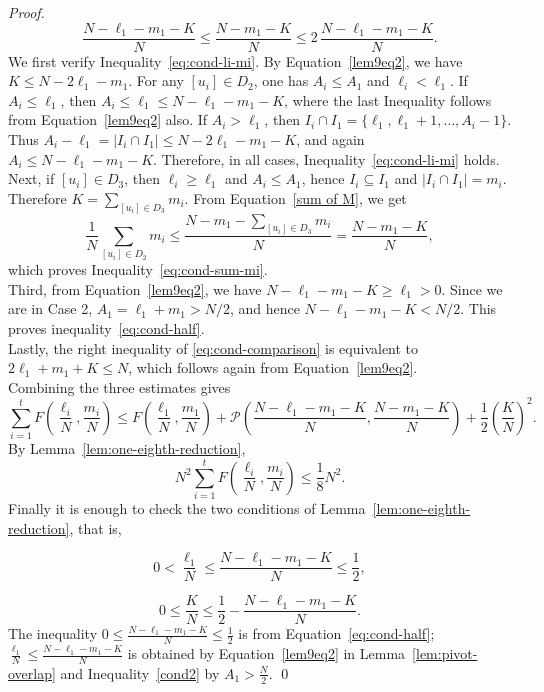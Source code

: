 \documentclass[runningheads,envcountsame,a4paper]{llncs}
\begin{document}
\begin{proof}
\begin{equation}\label{eq:cond-comparison}
    \frac{N-\ell_1-m_1-K}{N}
    \le
    \frac{N-m_1-K}{N}
    \le
    2\,\frac{N-\ell_1-m_1-K}{N}.
\end{equation}
We first verify Inequality~\ref{eq:cond-li-mi}. By Equation~\ref{lem9eq2}, we have $K\leq N-2\ell_1-m_1$.
For any $[u_i]\in D_2$, one has $A_i\leq A_1$ and $\ell_i<\ell_1$. If $A_i\leq \ell_1$, then
$A_i\leq \ell_1\leq N-\ell_1-m_1-K$, where the last Inequality follows from Equation~\ref{lem9eq2} also. If $A_i>\ell_1$, then
$I_i\cap I_1=\{\ell_1,\ell_1+1,\ldots,A_i-1\}$. Thus
$A_i-\ell_1=|I_i\cap I_1|\leq N-2\ell_1-m_1-K$, and again $A_i\leq N-\ell_1-m_1-K$. Therefore, in all cases, Inequality~\ref{eq:cond-li-mi} holds.\\
Next, if $[u_i]\in D_3$, then $\ell_i\geq \ell_1$ and $A_i\leq A_1$, hence $I_i\subseteq I_1$ and $|I_i\cap I_1|=m_i$. Therefore $K=\sum_{[u_i]\in D_3}m_i$. From Equation~\ref{sum of M}, we get
\[
\frac1N\sum_{[u_i]\in D_2}m_i
\leq \frac{N-m_1-\sum_{[u_i]\in D_3}m_i}{N}
= \frac{N-m_1-K}{N},
\]
which proves Inequality~\ref{eq:cond-sum-mi}.\\
Third, from Equation~\ref{lem9eq2}, we have $N-\ell_1-m_1-K\geq \ell_1>0$. Since we are in Case 2, $A_1=\ell_1+m_1>N/2$, and hence $N-\ell_1-m_1-K<N/2$. This proves inequality~\ref{eq:cond-half}.\\
Lastly, the right inequality of \ref{eq:cond-comparison} is equivalent to $2\ell_1+m_1+K\leq N$, which follows again from Equation~\ref{lem9eq2}.\\
Combining the three estimates gives
\[
\sum_{i=1}^t F(\frac{\ell_i}{N},\frac{m_i}{N})
\le
F(\frac{\ell_1}{N},\frac{m_1}{N})+\mathcal P(\frac{N-\ell_1-m_1-K}{N},\frac{N-m_1-K}{N})+\frac12(\frac{K}{N})^2
.
\]
By Lemma~\ref{lem:one-eighth-reduction},
\[
N^2\sum_{i=1}^tF(\frac{\ell_i}{N},\frac{m_i}{N})
\le
\frac18N^2.
\]
Finally it is enough to check the two conditions of Lemma~\ref{lem:one-eighth-reduction}, that is,

\begin{equation}\label{cond1}
0< \frac{\ell_1}{N}\le \frac{N-\ell_1-m_1-K}{N}\le \frac12,   
\end{equation}

\begin{equation}\label{cond2}
0\le \frac{K}{N}\le\frac12-\frac{N-\ell_1-m_1-K}{N}.
\end{equation}
The inequality $0\le\frac{N-\ell_1-m_1-K}{N}\le\frac{1}{2}$ is from Equation~\ref{eq:cond-half}; $\frac{\ell_1}{N}\le \frac{N-\ell_1-m_1-K}{N}$ is obtained by Equation~\ref{lem9eq2} in Lemma~\ref{lem:pivot-overlap} and Inequality~\ref{cond2} by $A_1>\frac N2$. \qed
\end{proof}
\end{document}
